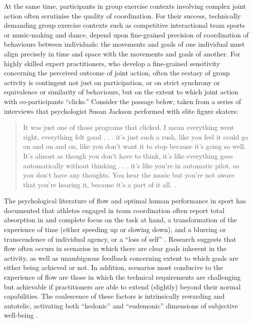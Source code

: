 \begin{CJK}{UTF8}{gbsn}

At the same time, participants in group exercise contexts involving complex joint action often scrutinise the quality of coordination.  For their success, technically demanding group exercise contexts such as competitive interactional team sports or music-making and dance, depend upon fine-grained precision of coordination of behaviours between individuals:  the movements and goals of one individual must align precisely in time and space with the movements and goals of another.  For highly skilled expert practitioners, who develop a fine-grained sensitivity concerning the perceived outcome of joint action, often the ecstasy of group activity is contingent not just on participation, or on strict synchrony or equivalence or similarity of behaviours, but on the extent to which joint action with co-participants ``clicks.''  Consider the passage below, taken from a series of interviews that psychologist Susan Jackson performed with elite figure skaters:
  \begin{quotation}
    It was just one of those programs that clicked. I mean everything went right, everything felt good . . . it's just such a rush, like you feel it could go on and on and on, like you don't want it to stop because it's going so well.  It's almost as though you don't have to think, it's like everything goes automatically without thinking . . . it's like you're in automatic pilot, so you don‘t have any thoughts.  You hear the music but you're not aware that you're hearing it, because it's a part of it all. \citep[168]{Jackson1992}.
  \end{quotation}

The psychological literature of flow and optimal human performance in sport has documented that athletes engaged in team coordination often report total absorption in and complete focus on the task at hand, a transformation of the experience of time (either speeding up or slowing down), and a blurring or transcendence of individual agency, or a ``loss of self''   \citep{Csikszentmihalyi1992,Jackson1995,Jackson1999,McNeill1995}.  Research suggests that flow often occurs in scenarios in which there are clear goals inherent in the activity, as well as unambiguous feedback concerning extent to which goals are either being achieved or not.  In addition, scenarios most conducive to the experience of flow are those in which the technical requirements are challenging but achievable if practitioners are able to extend (slightly) beyond their normal capabilities\citep{Fong2015}.  The coalescence of these factors is intrinsically rewarding and autotelic\citep{Csikszentmihalyi1975}, activating both ``hedonic'' and ``eudemonic'' dimensions of subjective well-being \citep{Huta2010,Fave2009}.


\end{CJK}

